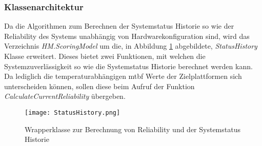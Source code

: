 \subsubsection*{Klassenarchitektur}
Da die Algorithmen zum Berechnen der Systemstatus Historie so wie der Reliability des Systems unabhängig von Hardwarekonfiguration sind, wird das Verzeichnis \textit{HM.ScoringModel} um die, in Abbildung \ref{fig:SystemHistoryWrapper} abgebildete, \textit{StatusHistory} Klasse erweitert. Dieses bietet zwei Funktionen, mit welchen die Systemzuverlässigkeit so wie die Systemstatus Historie berechnet werden kann. Da lediglich die temperaturabhängigen \ac{mtbf} Werte der Zielplattformen sich unterscheiden können, sollen diese beim Aufruf der Funktion \textit{CalculateCurrentReliability} übergeben. 
\begin{center}
    \begin{figure}[h!]
        \centering
        \texttt{[image: StatusHistory.png]}
        \caption{Wrapperklasse zur Berechnung von Reliability und der Systemstatus Historie}
        \label{fig:SystemHistoryWrapper}
    \end{figure}
\end{center}
\vspace{-0.5cm}
